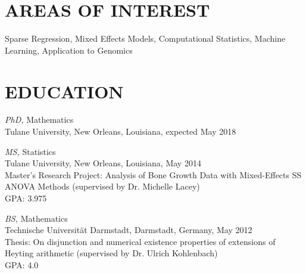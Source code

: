 \documentclass[margin]{res} %
\begin{document}
\begin{resume}
%
%
%
%

\section{AREAS OF INTEREST}

Sparse Regression, Mixed Effects Models, Computational Statistics, Machine Learning, Application to Genomics


\section{EDUCATION}

{\sl PhD,} Mathematics \\
Tulane University, New Orleans, Louisiana, expected May 2018

{\sl MS,} Statistics \\
Tulane University, New Orleans, Louisiana, May 2014\\
Master's Research Project: Analysis of Bone Growth Data with Mixed-Effects SS ANOVA Methods (supervised by Dr. Michelle Lacey)\\
GPA: 3.975

{\sl BS,} Mathematics\\
Technische Universit\"{a}t Darmstadt, Darmstadt, Germany, May 2012\\
Thesis: On disjunction and numerical existence properties of extensions of Heyting arithmetic (supervised by Dr. Ulrich Kohlenbach)\\
GPA: 4.0


\end{resume}
\end{document}

